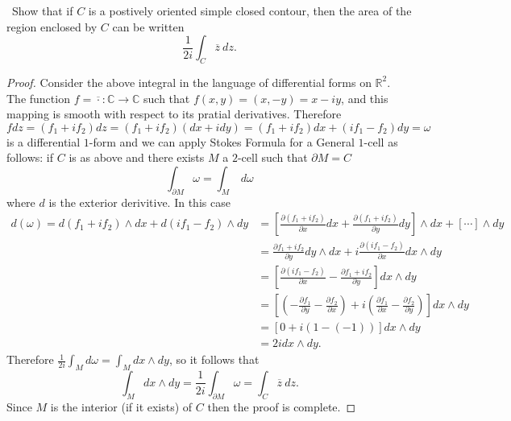 \documentclass[11pt]{amsart}
\theoremstyle{definition}
\numberwithin{theorem}{section}
\numberwithin{definition}{section}
\numberwithin{equation}{section}
\begin{document}
\medskip {}\ Show that if $C$ is a postively oriented simple closed contour, then the area of the region enclosed by $C$ can be written
\begin{equation*}
	\frac{1}{2i}\int_{C}\overline{z}\ dz.
\end{equation*}
\begin{proof}
	Consider the above integral in the language of differential forms on $\mathbb{R}^2$. The function $f = \overline{\cdot}: \mathbb{C} \to \mathbb{C}$ such that $f(x,y) = (x, -y) = x -iy$, and this mapping is smooth with respect to its pratial derivatives. Therefore $f dz = (f_1 + if_2) dz = (f_1 + if_2)(dx + idy) = (f_1+if_2)dx +(if_1  -f_2)dy = \omega$ is a differential $1$-form and we can apply Stokes Formula for a General $1$-cell as follows: if $C$ is as above and  there exists $M$ a $2$-cell such that $\partial M = C$
	\begin{equation*}
		\int_{\partial M} \omega = \int_M\ d\omega
	\end{equation*}
	where $d$ is the exterior derivitive. In this case 
	\begin{equation*}
		\begin{aligned}
				d(\omega) = d(f_1 + if_2) \wedge dx + d(if_1  -f_2) \wedge dy &=
				 \left[ \frac{\partial(f_1 + if_2)}{\partial x} dx + \frac{\partial (f_1+ if_2)}{\partial y} dy \right] \wedge dx +  \left[\cdots\right] \wedge dy \\
				&= \frac{\partial f_1+if_2}{\partial y} dy \wedge dx +  i\frac{\partial (if_1-f_2)}{\partial x} dx \wedge dy \\
				 &=\left[ \frac{\partial (if_1-f_2)}{\partial x} - \frac{\partial f_1+if_2}{\partial y} \right] dx \wedge dy  \\
				 &= \left[\left(-\frac{\partial f_1}{\partial y}  -\frac{\partial f_2}{\partial x}\right) + i\left(\frac{\partial f_1}{\partial x}  -\frac{\partial f_2}{\partial y}\right)\right] dx \wedge dy \\
				 &= \left[0 + i(1 -(-1))\right] dx \wedge dy\\
				 &= 2i dx \wedge dy.
		\end{aligned}
	\end{equation*}
	Therefore $\frac{1}{2i} \int_M d\omega = \int_M dx \wedge dy$, so 	it follows that
	\begin{equation*}
		\int_M dx \wedge dy = \frac{1}{2i} \int_{\partial M} \omega = \int_C \overline{z}\ dz.
	\end{equation*}
	Since $M$ is the interior (if it exists) of $C$ then the proof is complete.
\end{proof}
\end{document}
